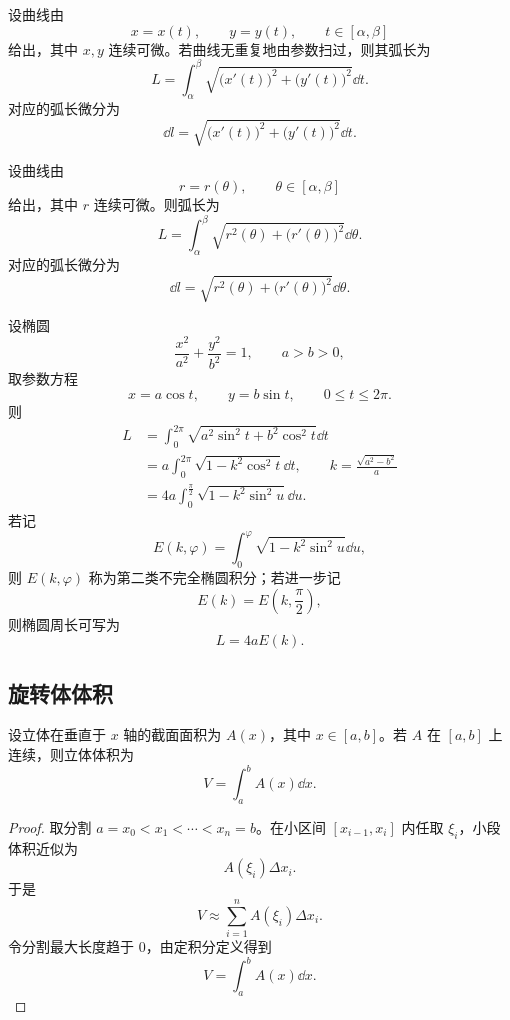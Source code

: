\begin{proposition}[参数方程的弧长]
	设曲线由
	\[
	x=x(t),\qquad y=y(t),\qquad t\in[\alpha,\beta]
	\]
	给出，其中 $x,y$ 连续可微。若曲线无重复地由参数扫过，则其弧长为
	\[
	L=\int_{\alpha}^{\beta}
	\sqrt{\bigl(x'(t)\bigr)^2+\bigl(y'(t)\bigr)^2}\dd t .
	\]
	对应的弧长微分为
	\[
	\dd l=\sqrt{\bigl(x'(t)\bigr)^2+\bigl(y'(t)\bigr)^2}\dd t .
	\]
\end{proposition}
\begin{proposition}[极坐标方程的弧长]
	设曲线由
	\[
	r=r(\theta),\qquad \theta\in[\alpha,\beta]
	\]
	给出，其中 $r$ 连续可微。则弧长为
	\[
	L=\int_{\alpha}^{\beta}
	\sqrt{r^2(\theta)+\bigl(r'(\theta)\bigr)^2}\dd\theta .
	\]
	对应的弧长微分为
	\[
	\dd l=\sqrt{r^2(\theta)+\bigl(r'(\theta)\bigr)^2}\dd\theta .
	\]
\end{proposition}
\begin{example}[椭圆周长]
	设椭圆
	\[
	\frac{x^2}{a^2}+\frac{y^2}{b^2}=1,
	\qquad a>b>0,
	\]
	取参数方程
	\[
	x=a\cos t,
	\qquad
	y=b\sin t,
	\qquad 0\leq t\leq 2\pi .
	\]
	则
	\[
	\begin{aligned}
		L
		&=\int_0^{2\pi}\sqrt{a^2\sin^2t+b^2\cos^2t}\dd t \\
		&=a\int_0^{2\pi}\sqrt{1-k^2\cos^2t}\dd t,
		\qquad k=\frac{\sqrt{a^2-b^2}}{a} \\
		&=4a\int_0^{\frac{\pi}{2}}\sqrt{1-k^2\sin^2u}\dd u .
	\end{aligned}
	\]
	若记
	\[
	E(k,\varphi)=\int_0^{\varphi}\sqrt{1-k^2\sin^2u}\dd u,
	\]
	则 $E(k,\varphi)$ 称为第二类不完全椭圆积分；若进一步记
	\[
	E(k)=E\left(k,\frac{\pi}{2}\right),
	\]
	则椭圆周长可写为
	\[
	L=4aE(k).
	\]
\end{example}

\subsection*{旋转体体积}

\begin{proposition}[已知截面积的体积]
	设立体在垂直于 $x$ 轴的截面面积为 $A(x)$，其中 $x\in[a,b]$。若 $A$ 在 $[a,b]$ 上连续，则立体体积为
	\[
	V=\int_a^b A(x)\dd x .
	\]
\end{proposition}

\begin{proof}
	取分割 $a=x_0<x_1<\cdots<x_n=b$。在小区间 $[x_{i-1},x_i]$ 内任取 $\xi_i$，小段体积近似为
	\[
	A(\xi_i)\Delta x_i .
	\]
	于是
	\[
	V\approx \sum_{i=1}^n A(\xi_i)\Delta x_i .
	\]
	令分割最大长度趋于 $0$，由定积分定义得到
	\[
	V=\int_a^b A(x)\dd x .
	\]
\end{proof}

